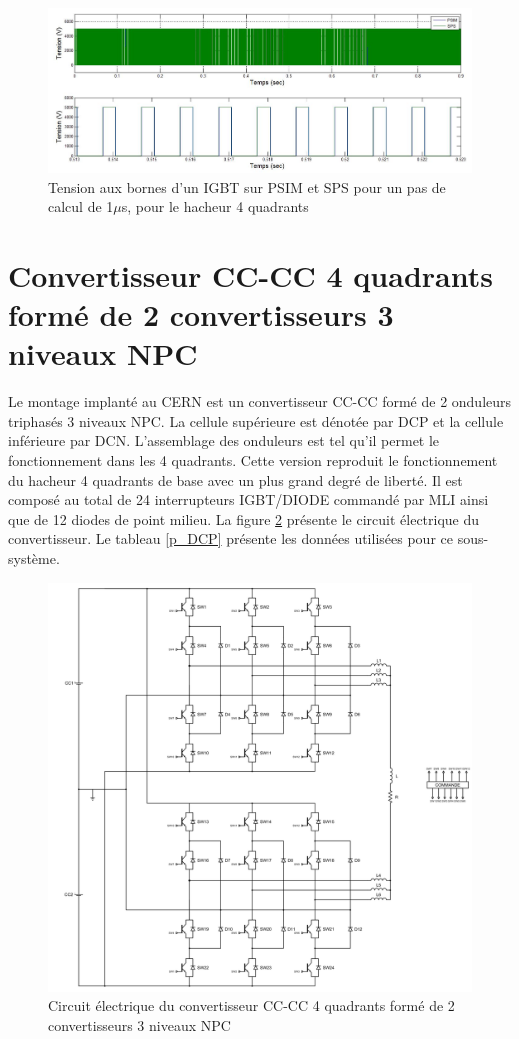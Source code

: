 \begin{figure}[htb]
\centering
\includegraphics[scale=0.5]{fig/Hacheur4Quadrants/HacheurTensionIGBT1u.jpg}
\caption{Tension aux bornes d'un IGBT sur PSIM et SPS pour un pas de calcul de 1$\mu$s, pour le hacheur 4 quadrants}
\label{hc_IG_ten_1}
\end{figure}


\clearpage
\section{Convertisseur CC-CC 4 quadrants formé de 2 convertisseurs 3 niveaux NPC}
Le montage implanté au CERN est un convertisseur CC-CC formé de 2 onduleurs triphasés 3 niveaux NPC. La cellule supérieure est dénotée par DCP et la cellule inférieure par DCN. L'assemblage des onduleurs est tel qu'il permet le fonctionnement dans les 4 quadrants. Cette version reproduit le fonctionnement du hacheur 4 quadrants de base avec un plus grand degré de liberté. Il est composé au total de 24 interrupteurs IGBT/DIODE commandé par MLI ainsi que de 12 diodes de point milieu. La figure \ref{circuit_DCP_DCN} présente le circuit électrique du convertisseur. Le tableau \ref{p_DCP} présente les données utilisées pour ce sous-système.


\begin{figure}[htb]
\centering
\includegraphics[scale=0.75]{fig/DCP_DCN.png}
\caption{Circuit électrique du convertisseur CC-CC 4 quadrants formé de 2 convertisseurs 3 niveaux NPC}
\label{circuit_DCP_DCN}
\end{figure}


